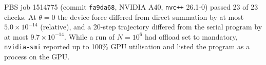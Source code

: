 PBS job 1514775 (commit \texttt{fa9da68}, NVIDIA A40, \texttt{nvc++} 26.1-0) passed 23 of 23 checks. At $\theta=0$ the device force differed from direct summation by at most $5.0\times10^{-14}$ (relative), and a 20-step trajectory differed from the serial program by at most $9.7\times10^{-14}$. While a run of $N=10^6$ had offload set to mandatory, \texttt{nvidia-smi} reported up to 100\% GPU utilisation and listed the program as a process on the GPU.
